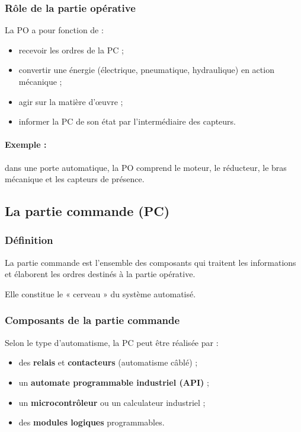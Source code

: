 \subsubsection{Rôle de la partie opérative}

La PO a pour fonction de :

\begin{itemize}
    \item recevoir les ordres de la PC ;
    \item convertir une énergie (électrique, pneumatique, hydraulique) en action mécanique ;
    \item agir sur la matière d'œuvre ;
    \item informer la PC de son état par l'intermédiaire des capteurs.
\end{itemize}

\paragraph{Exemple :} dans une porte automatique, la PO comprend le moteur, le réducteur, le bras mécanique et les capteurs de présence.

\subsection{La partie commande (PC)}

\subsubsection{Définition}

La partie commande est l'ensemble des composants qui traitent les informations et élaborent les ordres destinés à la partie opérative.

Elle constitue le « cerveau » du système automatisé.

\subsubsection{Composants de la partie commande}

Selon le type d'automatisme, la PC peut être réalisée par :

\begin{itemize}
    \item des \textbf{relais} et \textbf{contacteurs} (automatisme câblé) ;
    \item un \textbf{automate programmable industriel (API)} ;
    \item un \textbf{microcontrôleur} ou un calculateur industriel ;
    \item des \textbf{modules logiques} programmables.
\end{itemize}

